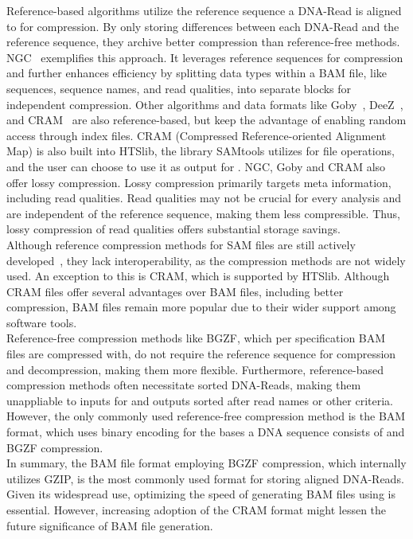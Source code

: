 Reference-based algorithms utilize the reference sequence a DNA-Read is aligned to for compression. By only storing differences between each DNA-Read and the reference sequence, they archive better compression than reference-free methods. NGC~\cite{popitsch_ngc_2013} exemplifies this approach. It leverages reference sequences for compression and further enhances efficiency by splitting data types within a BAM file, like sequences, sequence names, and read qualities, into separate blocks for independent compression. Other algorithms and data formats like Goby~\cite{campagne_compression_2013}, DeeZ~\cite{hach_deez_2014}, and CRAM~\cite{fritz_efficient_2011} are also reference-based, but keep the advantage of enabling random access through index files. CRAM (Compressed Reference-oriented Alignment Map) is also built into HTSlib, the library SAMtools utilizes for file operations, and the user can choose to use it as output for \sort. NGC, Goby and CRAM also offer lossy compression. Lossy compression primarily targets meta information, including read qualities. Read qualities may not be crucial for every analysis and are independent of the reference sequence, making them less compressible. Thus, lossy compression of read qualities offers substantial storage savings. \\

Although reference compression methods for SAM files are still actively developed~\cite{banerjee_abridge_2022}, they lack interoperability, as the compression methods are not widely used. An exception to this is CRAM, which is supported by HTSlib. Although CRAM files offer several advantages over BAM files, including better compression, BAM files remain more popular due to their wider support among software tools.\\

Reference-free compression methods like BGZF, which per specification BAM files are compressed with, do not require the reference sequence for compression and decompression, making them more flexible. Furthermore, reference-based compression methods often necessitate sorted DNA-Reads, making them unappliable to inputs for \sort and outputs sorted after read names or other criteria. However, the only commonly used reference-free compression method is the BAM format, which uses binary encoding for the bases a DNA sequence consists of and BGZF compression. \\

In summary, the BAM file format employing BGZF compression, which internally utilizes GZIP, is the most commonly used format for storing aligned DNA-Reads. Given its widespread use, optimizing the speed of generating BAM files using \sort is essential. However, increasing adoption of the CRAM format might lessen the future significance of BAM file generation.


